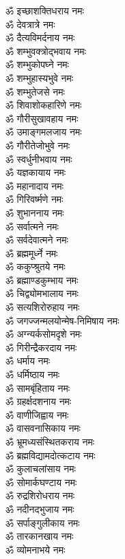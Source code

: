 \begin{multicols}{2}
\begin{flushleft}
ॐ इच्छाशक्तिधराय नमः\\
ॐ देवत्रात्रे नमः\\
ॐ दैत्यविमर्दनाय नमः\\
ॐ शम्भुवक्त्रोद्भवाय नमः\hfill{}\\
ॐ शम्भुकोपघ्ने नमः\\
ॐ शम्भुहास्यभुवे नमः\\
ॐ शम्भुतेजसे नमः\\
ॐ शिवाशोकहारिणे नमः\\
ॐ गौरीसुखावहाय नमः\\
ॐ उमाङ्गमलजाय नमः\\
ॐ गौरीतेजोभुवे नमः\\
ॐ स्वर्धुनीभवाय नमः\\
ॐ यज्ञकायाय नमः\\
ॐ महानादाय नमः\hfill{}\\
ॐ गिरिवर्ष्मणे नमः\\
ॐ शुभाननाय नमः\\
ॐ सर्वात्मने नमः\\
ॐ सर्वदेवात्मने नमः\\
ॐ ब्रह्ममूर्ध्ने नमः\\
ॐ ककुप्श्रुतये नमः\\
ॐ ब्रह्माण्डकुम्भाय नमः\\
ॐ चिद्व्योमभालाय नमः\\
ॐ सत्यशिरोरुहाय नमः\\
ॐ जगज्जन्मलयोन्मेष-निमिषाय नमः\hfill{}\\
ॐ अग्न्यर्कसोमदृशे नमः\\
ॐ गिरीन्द्रैकरदाय नमः\\
ॐ धर्माय नमः\\
ॐ धर्मिष्ठाय नमः\\
ॐ सामबृंहिताय नमः\\
ॐ ग्रहर्क्षदशनाय नमः\\
ॐ वाणीजिह्वाय नमः\\
ॐ वासवनासिकाय नमः\\
ॐ भ्रूमध्यसंस्थितकराय नमः\\
ॐ ब्रह्मविद्यामदोत्कटाय नमः\hfill{}\\
ॐ कुलाचलांसाय नमः\\
ॐ सोमार्कघण्टाय नमः\\
ॐ रुद्रशिरोधराय नमः\\
ॐ नदीनदभुजाय नमः\\
ॐ सर्पाङ्गुलीकाय नमः\\
ॐ तारकानखाय नमः\\
ॐ व्योमनाभये नमः\\

\end{flushleft}
\end{multicols}
